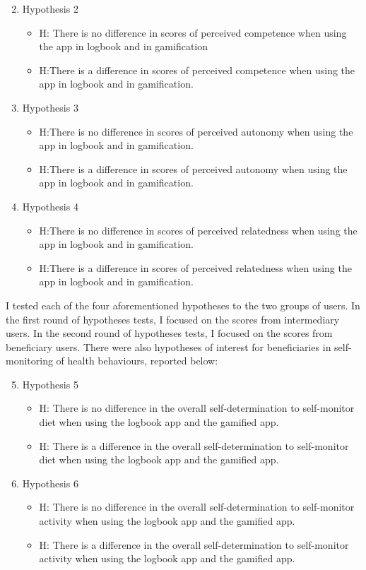 \begin{enumerate}
 \setcounter{enumi}{1}
\item{Hypothesis 2}
\begin{itemize}
\item{H}: There is no difference in scores of perceived competence when using the app in logbook and in gamification
\item{H}:There is a difference in scores of perceived competence when using the app in logbook and in gamification.
\end{itemize}
\item{Hypothesis 3}
\begin{itemize}
\item{H}:There is no difference in scores of perceived autonomy when using the app in logbook and in gamification.
\item{H}:There is a difference in scores of perceived autonomy when using the app in logbook and in gamification.
\end{itemize}
\item{Hypothesis 4}
\begin{itemize}
\item{H}:There is no difference in scores of perceived relatedness when using the app in logbook and in gamification.
\item{H}:There is a difference in scores of perceived relatedness when using the app in logbook and in gamification.
\end{itemize}
\end{enumerate}

I tested each of the four aforementioned hypotheses to the two groups of users. In the first round of hypotheses tests, I focused on the scores from intermediary users. In the second round of hypotheses tests, I focused on the scores from beneficiary users. There were also hypotheses of interest for beneficiaries in self-monitoring of health behaviours, reported below:

\begin{enumerate}
 \setcounter{enumi}{4}
\item{Hypothesis 5}
\begin{itemize}
\item{H}: There is no difference in the overall self-determination to self-monitor diet when using the logbook app and the gamified app.
\item{H}: There is a difference in the overall self-determination to self-monitor diet when using the logbook app and the gamified app.
\end{itemize}
\item{Hypothesis 6}
\begin{itemize}
\item{H}: There is no difference in the overall self-determination to self-monitor activity when using the logbook app and the gamified app.
\item{H}: There is a difference in the overall self-determination to self-monitor activity when using the logbook app and the gamified app.
\end{itemize}
\end{enumerate}

